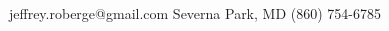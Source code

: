 \documentclass[darkhipster]{simplehipstercv}
\newlength{\rightcolwidth}
\begin{document}
\begin{paracol}{2}






\vfill{} %

\setlength{\parindent}{0pt}
\begin{center}\fontfamily{\sfdefault}\selectfont \color{black!70}
{\small {} jeffrey.roberge@gmail.com  Severna Park, MD  (860) 754-6785
}
\end{center}

\end{paracol}
\end{document}
